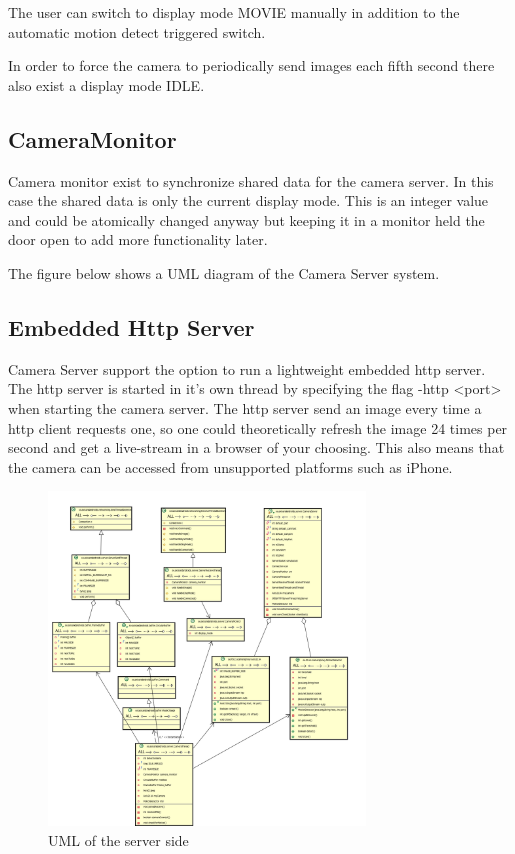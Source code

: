 \documentclass[8pt,titlepage]{article}
\begin{document}
The user can switch to display mode MOVIE manually in addition to the automatic motion detect triggered switch.

In order to force the camera to periodically send images each fifth second there also exist a display mode IDLE.

\subsection{CameraMonitor}
Camera monitor exist to synchronize shared data for the camera server. In this case the shared data is only the current display mode. This is an integer value and could be atomically changed anyway but keeping it in a monitor held the door open to add more functionality later.

The figure below shows a UML diagram of the Camera Server system. 

\subsection{Embedded Http Server}
Camera Server support the option to run a lightweight embedded http server. The http server is started in it’s own thread by specifying the flag -http <port> when starting the camera server. The http server send an image every time a http client requests one, so one could theoretically refresh the image 24 times per second and get a live-stream in a browser of your choosing. This also means that the camera can be accessed from unsupported platforms such as iPhone.

\begin{figure}[hbp]
\includegraphics[width=0.75\textwidth]{../uml/server.png}
\caption{UML of the server side}
\end{figure}
\end{document}
